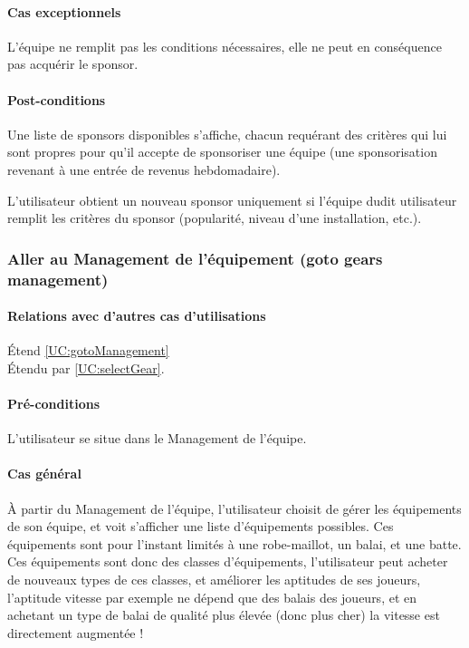\paragraph{Cas exceptionnels}
L'équipe ne remplit pas les conditions nécessaires, elle ne peut en conséquence pas acquérir le sponsor. 
\paragraph{Post-conditions}
\begin{list}{}{\leftmargin=1.5em}
\item{Une liste de sponsors disponibles s'affiche, chacun requérant des critères qui lui sont propres pour qu'il accepte de sponsoriser une équipe (une sponsorisation revenant à une entrée de revenus hebdomadaire).}
\item{L'utilisateur obtient un nouveau sponsor uniquement si l'équipe dudit utilisateur remplit les critères du sponsor (popularité, niveau d'une installation, etc.).}
\end{list}

\subsubsection{Aller au Management de l'équipement (goto gears management)}
\label{UC:gotoGear}
\paragraph{Relations avec d'autres cas d'utilisations}
Étend \ref{UC:gotoManagement}\\
Étendu par \ref{UC:selectGear}.
\paragraph{Pré-conditions}
\begin{list}{}{\leftmargin=1.5em}
\item{L'utilisateur se situe dans le Management de l'équipe.}
\end{list}
\paragraph{Cas général}
À partir du Management de l'équipe, l'utilisateur choisit de gérer les équipements de son équipe, et voit s'afficher une liste d'équipements possibles. Ces équipements sont pour l'instant limités à une robe-maillot, un balai, et une batte. Ces équipements sont donc des classes d'équipements, l'utilisateur peut acheter de nouveaux types de ces classes, et améliorer les aptitudes de ses joueurs, l'aptitude vitesse par exemple ne dépend que des balais des joueurs, et en achetant un type de balai de qualité plus élevée (donc plus cher) la vitesse est directement augmentée !
